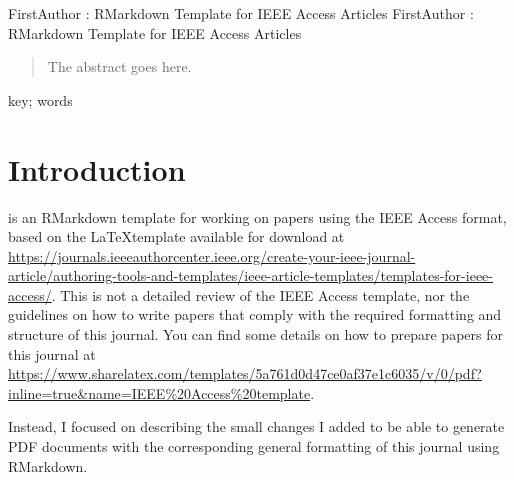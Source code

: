 \documentclass[]{latex/ieeeaccess}
\providecommand\correspondingauthor{}
\begin{document}
%
\address[\the\value{counter2}\addtocounter{counter2}{1}]{Department of Research and Development, University of City, City, Postcode (e-mail: \href{mailto:author5@email.com}{\nolinkurl{author5@email.com}})}

%


\markboth
{FirstAuthor \headeretal: RMarkdown Template for IEEE Access Articles} %
{FirstAuthor \headeretal: RMarkdown Template for IEEE Access Articles} %

\corresp{\correspondingauthor}

\begin{abstract}
The abstract goes here.
\end{abstract}

\begin{keywords}
key; words
\end{keywords}

\titlepgskip=-15pt

\maketitle



\hypertarget{introduction}{%
\section{Introduction}\label{introduction}}

 is an RMarkdown template for working on papers using
the IEEE Access format, based on the \LaTeX  template available for
download at
\url{https://journals.ieeeauthorcenter.ieee.org/create-your-ieee-journal-article/authoring-tools-and-templates/ieee-article-templates/templates-for-ieee-access/}.
This is not a detailed review of the IEEE Access template, nor the
guidelines on how to write papers that comply with the required
formatting and structure of this journal. You can find some details on
how to prepare papers for this journal at
\url{https://www.sharelatex.com/templates/5a761d0d47ce0af37e1c6035/v/0/pdf?inline=true\&name=IEEE\%20Access\%20template}.

Instead, I focused on describing the small changes I added to be able to
generate PDF documents with the corresponding general formatting of this
journal using RMarkdown.
\end{document}
